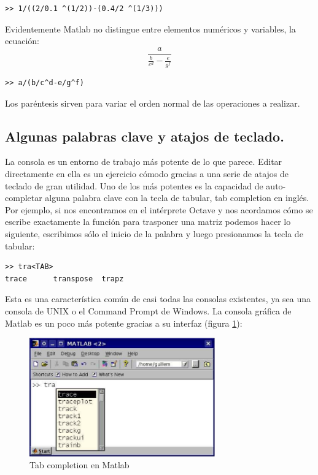 \begin{verbatim}
>> 1/((2/0.1 ^(1/2))-(0.4/2 ^(1/3)))
\end{verbatim}

Evidentemente Matlab no distingue entre elementos numéricos y
variables, la ecuación:
$$\frac{a}{\frac{b}{c{}^{d}}-\frac{e}{g^{f}}}$$
\begin{verbatim}
>> a/(b/c^d-e/g^f)
\end{verbatim}

Los paréntesis sirven para variar el orden normal de las operaciones a
realizar.


\subsection{Algunas palabras clave y atajos de teclado.}

La consola es un entorno de trabajo más potente de lo que parece.
Editar directamente en ella es un ejercicio cómodo gracias a una serie
de atajos de teclado de gran utilidad. Uno de los más potentes es la
capacidad de auto-completar alguna palabra clave con la tecla de
tabular, tab completion en inglés. Por ejemplo, si nos encontramos en
el intérprete Octave y nos acordamos cómo se escribe exactamente la
función para trasponer una matriz podemos hacer lo siguiente,
escribimos sólo el inicio de la palabra y luego presionamos la tecla
de tabular:

\begin{verbatim}
>> tra<TAB>
trace      transpose  trapz
\end{verbatim}

Esta es una característica común de casi todas las consolas
existentes, ya sea una consola de UNIX o el Command Prompt de Windows.
La consola gráfica de Matlab es un poco más potente gracias a su
interfaz (figura \ref{cap:Tab-completion-en}):

%
\begin{figure}[h]
  \centering{}\includegraphics[width=8cm,
  keepaspectratio]{figuras/autocompletion}


  \caption{\label{cap:Tab-completion-en}Tab completion en Matlab}
\end{figure}


